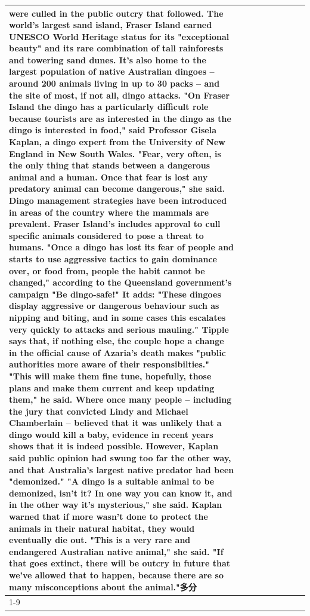 \begin{table}[H]
\begin{tabular}{lllrlllll}
were culled in the public outcry that followed. The world's largest sand island, Fraser Island earned UNESCO World Heritage status for its "exceptional beauty" and its rare combination of tall rainforests and towering sand dunes. It's also home to the largest population of native Australian dingoes -- around 200 animals living in up to 30 packs -- and the site of most, if not all, dingo attacks. "On Fraser Island the dingo has a particularly difficult role because tourists are as interested in the dingo as the dingo is interested in food," said Professor Gisela Kaplan, a dingo expert from the University of New England in New South Wales. "Fear, very often, is the only thing that stands between a dangerous animal and a human. Once that fear is lost any predatory animal can become dangerous," she said. Dingo management strategies have been introduced in areas of the country where the mammals are prevalent. Fraser Island's includes approval to cull specific animals considered to pose a threat to humans. "Once a dingo has lost its fear of people and starts to use aggressive tactics to gain dominance over, or food from, people the habit cannot be changed," according to the Queensland government's campaign "Be dingo-safe!" It adds: "These dingoes display aggressive or dangerous behaviour such as nipping and biting, and in some cases this escalates very quickly to attacks and serious mauling." Tipple says that, if nothing else, the couple hope a change in the official cause of Azaria's death makes "public authorities more aware of their responsibilties." "This will make them fine tune, hopefully, those plans and make them current and keep updating them," he said. Where once many people -- including the jury that convicted Lindy and Michael Chamberlain -- believed that it was unlikely that a dingo would kill a baby, evidence in recent years shows that it is indeed possible. However, Kaplan said public opinion had swung too far the other way, and that Australia's largest native predator had been "demonized." "A dingo is a suitable animal to be demonized, isn't it? In one way you can know it, and in the other way it's mysterious," she said. Kaplan warned that if more wasn't done to protect the animals in their natural habitat, they would eventually die out. "This is a very rare and endangered Australian native animal," she said. "If that goes extinct, there will be outcry in future that we've allowed that to happen, because there are so many misconceptions about the animal."多分 \\
\cline{1-9}

\end{tabular}
\end{table}
